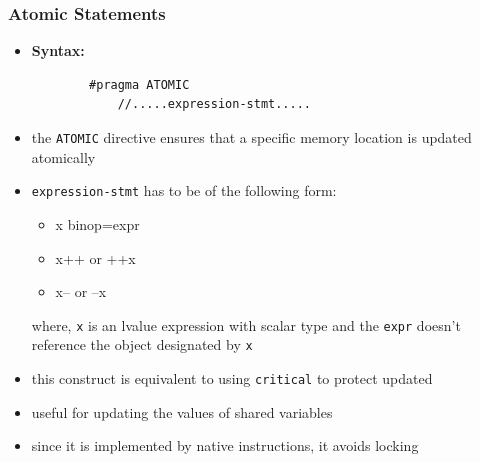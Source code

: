 \documentclass[12pt, a4paper]{report}
\begin{document}
\subsubsection{Atomic Statements}
\begin{itemize}
    \item {\bfseries{Syntax: }}
    \begin{verbatim}
        #pragma ATOMIC
            //.....expression-stmt.....
    \end{verbatim}
    \item the \verb$ATOMIC$ directive ensures that a specific memory location is updated atomically
    \item \verb$expression-stmt$ has to be of the following form:
    \begin{itemize}
        \item x binop=expr
        \item x++ or ++x
        \item x-- or --x
    \end{itemize}
    where, \verb$x$ is an lvalue expression with scalar type and the \verb$expr$ doesn't reference the object designated by \verb$x$
    \item this construct is equivalent to using \verb$critical$ to protect updated
    \item useful for updating the values of shared variables
    \item since it is implemented by native instructions, it avoids locking
\end{itemize}
\end{document}
